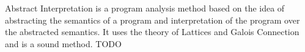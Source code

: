 \Large
Abstract Interpretation is a program analysis method based on the idea
of abstracting the semantics of a program and interpretation of the
program over the abstracted semantics.
It uses the theory of Lattices and Galois Connection and is a sound method.
TODO
